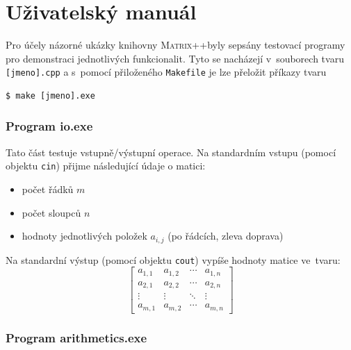 \documentclass[11pt,a4paper]{article}
\newcommand{\mpp}{\textsc{Matrix++}}
\theoremstyle{remark}
\begin{document}
\pagebreak

\part{Uživatelský manuál}
Pro účely názorné ukázky knihovny \mpp byly sepsány testovací programy pro
demonstraci jednotlivých funkcionalit.
Tyto se nacházejí v~souborech tvaru \verb=[jmeno].cpp= a s~pomocí přiloženého
\verb=Makefile= je lze přeložit příkazy tvaru
\begin{verbatim}
$ make [jmeno].exe
\end{verbatim}

\section{Program io.exe} \label{io.exe}

Tato část testuje vstupně/výstupní operace.
Na standardním vstupu (pomocí objektu \verb=cin=) přijme následující údaje o
matici:
\begin{itemize}
\item počet řádků $m$
\item počet sloupců $n$
\item hodnoty jednotlivých položek $a_{i,j}$ (po řádcích, zleva doprava)
\end{itemize}
Na standardní výstup (pomocí objektu \verb=cout=) vypíše hodnoty matice
ve~tvaru:
\[
  \begin{bmatrix}
    a_{1,1} & a_{1,2} & \cdots & a_{1,n} \\
    a_{2,1} & a_{2,2} & \cdots & a_{2,n} \\
    \vdots  & \vdots  & \ddots & \vdots  \\
    a_{m,1} & a_{m,2} & \cdots & a_{m,n}
  \end{bmatrix}
\]

\section{Program arithmetics.exe}
\end{document}
